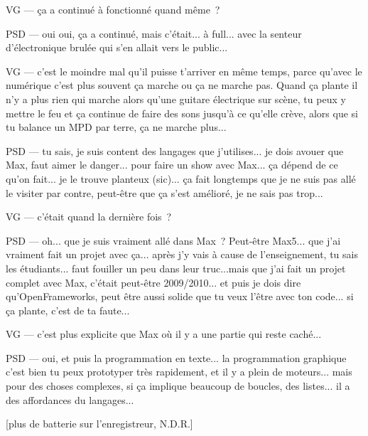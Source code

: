 VG — ça a continué à fonctionné quand même ?

PSD — oui oui, ça a continué, mais c'était... à full... avec la senteur d'électronique brulée qui s'en allait vers le public...

VG — c'est le moindre mal qu'il puisse t'arriver en même temps, parce qu'avec le numérique c'est plus souvent ça marche ou ça ne marche pas. Quand ça plante il n'y a plus rien qui marche alors qu'une guitare électrique sur scène, tu peux y mettre le feu et ça continue de faire des sons jusqu'à ce qu'elle crève, alors que si tu balance un MPD par terre, ça ne marche plus...

PSD — tu sais, je suis content des langages que j'utilises... je dois avouer que Max, faut aimer le danger... pour faire un show avec Max... ça dépend de ce qu'on fait... je le trouve planteux (sic)... ça fait longtemps que je ne suis pas allé le visiter par contre, peut-être que ça s'est amélioré, je ne sais pas trop...

VG — c'était quand la dernière fois ?

PSD — oh... que je suis vraiment allé dans Max ? Peut-être Max5... que j'ai vraiment fait un projet avec ça... après j'y vais à cause de l'enseignement, tu sais les étudiants... faut fouiller un peu dans leur truc...mais que j'ai fait un projet complet avec Max, c'était peut-être 2009/2010... et puis je dois dire qu'OpenFrameworks, peut être aussi solide que tu veux l'être avec ton code... si ça plante, c'est de ta faute...

VG — c'est plus explicite que Max où il y a une partie qui reste caché...

PSD — oui, et puis la programmation en texte... la programmation graphique c'est bien tu peux prototyper très rapidement, et il y a plein de moteurs... mais pour des choses complexes, si ça implique beaucoup de boucles, des listes... il a des affordances du langages...

[plus de batterie sur l'enregistreur, N.D.R.]